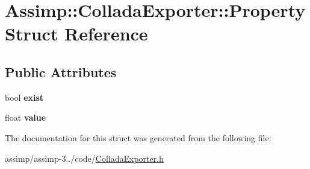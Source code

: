 \hypertarget{struct_assimp_1_1_collada_exporter_1_1_property}{\section{Assimp\+:\+:Collada\+Exporter\+:\+:Property Struct Reference}
\label{struct_assimp_1_1_collada_exporter_1_1_property}
}
\subsection*{Public Attributes}
\begin{DoxyCompactItemize}
\item 
\hypertarget{struct_assimp_1_1_collada_exporter_1_1_property_aa53613fb99c1c317ad6bda6e1bed31e3}{bool {\bfseries exist}}\label{struct_assimp_1_1_collada_exporter_1_1_property_aa53613fb99c1c317ad6bda6e1bed31e3}

\item 
\hypertarget{struct_assimp_1_1_collada_exporter_1_1_property_acd542b97b7f83397238411de2b396db6}{float {\bfseries value}}\label{struct_assimp_1_1_collada_exporter_1_1_property_acd542b97b7f83397238411de2b396db6}

\end{DoxyCompactItemize}


The documentation for this struct was generated from the following file\+:\begin{DoxyCompactItemize}
\item 
assimp/assimp-\/3../code/\hyperlink{_collada_exporter_8h}{Collada\+Exporter.\+h}\end{DoxyCompactItemize}
